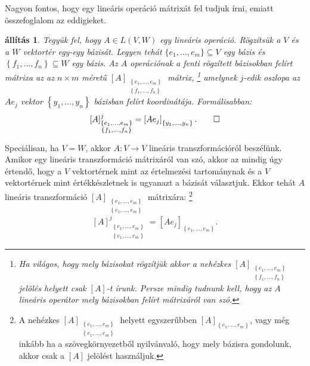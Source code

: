 \documentclass[9pt, a4paper, showtrims]{memoir}
\theoremstyle{plain}
\newtheorem{proposition}{állítás}[chapter]
\theoremstyle{remark}
\theoremstyle{definition}
\begin{document}
Nagyon fontos, hogy egy lineáris operáció mátrixát fel tudjuk írni, emiatt összefoglalom az eddigieket.
\begin{proposition}
    Tegyük fel, hogy $A\in L\left( V,W \right)$ egy lineáris operáció.
    Rögzítsük a $V$ és a $W$ vektortér egy-egy bázisát.
    Legyen tehát $\{e_1,\dots,e_m\}\subseteq V$ egy bázis és
    $\left\{ f_1,\dots,f_n \right\}\subseteq W$ egy bázis.
    Az $A$ operációnak a fenti rögzített bázisokban felírt mátrixa az az
    $n\times m$ méretű 
    $[A]_{\substack{\left\{ e_1,\dots,e_m \right\}\\ \left\{ f_1,\dots,f_n \right\}}}$ 
    mátrix,
    \footnote{Ha világos, hogy mely bázisokat rögzítjük akkor a nehézkes
        $[A]_{\substack{\left\{ e_1,\dots,e_m \right\}\\ \left\{ f_1,\dots,f_n \right\}}}$
        jelölés helyett csak $[A]$-t írunk.
        Persze mindig tudnunk kell, hogy az $A$ lineáris operátor mely bázisokban felírt mátrixáról van szó.
    }
    amelynek $j$-edik oszlopa az $Ae_j$ vektor $\left\{ y_1,\dots,y_n \right\}$ bázisban felírt koordinátája.
    Formálisabban:
    \[
        [A]_{\substack{\left\{ e_1,\dots,e_m \right\}\\ \left\{ f_1,\dots,f_n \right\}}}^j
        =
        \left[ Ae_j \right]_{\left\{ y_1,\dots,y_n \right\}}.
        \qedhere
    \]
\end{proposition}
Speciálisan, ha $V=W$, akkor $A:V\to V$ lineáris transzformációról beszélünk.
Amikor egy lineáris transzformáció mátrixáról van szó, 
akkor az mindig úgy értendő, hogy a $V$ vektortérnek mint az értelmezési tartománynak és a
$V$ vektortérnek mint értékkészletnek is ugyanazt a bázisát választjuk.
Ekkor tehát $A$ lineáris transzformáció 
$[A]_{\substack{\left\{ e_1,\dots,e_m \right\}\\ \left\{ e_1,\dots,e_m \right\}}}$ 
mátrixára:
\footnote{
    A nehézkes 
    $[A]_{\substack{\left\{ e_1,\dots,e_m \right\}\\ \left\{ e_1,\dots,e_m \right\}}}$ 
    helyett egyszerűbben
    $[A]_{\left\{ e_1,\dots,e_m \right\}}$, vagy még inkább ha a szövegkörnyezetből nyilvánvaló, hogy mely bázisra gondolunk,
    akkor csak a $[A]$ jelölést használjuk.
}
\[
    [A]_{\substack{\left\{ e_1,\dots,e_m \right\}\\ \left\{ e_1,\dots,e_m \right\}}}^j
    =
    \left[ Ae_j \right]_{\left\{ e_1,\dots,e_m \right\}}.
\]
\end{document}
